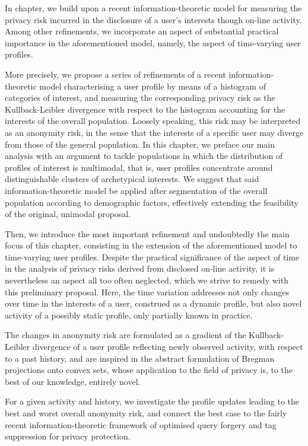In chapter, we build upon a recent information-theoretic model for measuring the privacy risk incurred in the disclosure of a user’s interests though on-line activity. Among other refinements, we incorporate an aspect of substantial practical importance in the aforementioned model, namely, the aspect of time-varying user profiles.

More precisely, we propose a series of refinements of a recent information-theoretic model characterising a user profile by means of a histogram of categories of interest, and measuring the corresponding privacy risk as the Kullback-Leibler divergence with respect to the histogram accounting for the interests of the overall population. Loosely speaking, this risk may be interpreted as an anonymity risk, in the sense that the interests of a specific user may diverge from those of the general population.
In this chapter, we preface our main analysis with an argument to tackle populations in which the distribution of profiles of interest is multimodal, that is, user profiles concentrate around distinguishable clusters of archetypical interests. We suggest that said information-theoretic model be applied after segmentation of the overall population according to demographic factors, effectively extending the feasibility of the original, unimodal proposal.

Then, we introduce the most important refinement and undoubtedly the main focus of this chapter, consisting in the extension of the aforementioned model to time-varying user profiles. Despite the practical significance of the aspect of time in the analysis of privacy risks derived from disclosed on-line activity, it is nevertheless an aspect all too often neglected, which we strive to remedy with this preliminary proposal. Here, the time variation addresses not only changes over time in the interests of a user, construed as a dynamic profile, but also novel activity of a possibly static profile, only partially known in practice.

The changes in anonymity risk are formulated as a gradient of the Kullback-Leibler divergence of a user profile reflecting newly observed activity, with respect to a past history, and are inspired in the abstract formulation of Bregman projections onto convex sets, whose application to the field of privacy is, to the best of our knowledge, entirely novel.

For a given activity and history, we investigate the profile updates leading to the best and worst overall anonymity risk, and connect the best case to the fairly recent information-theoretic framework of optimised query forgery and tag suppression for privacy protection.

